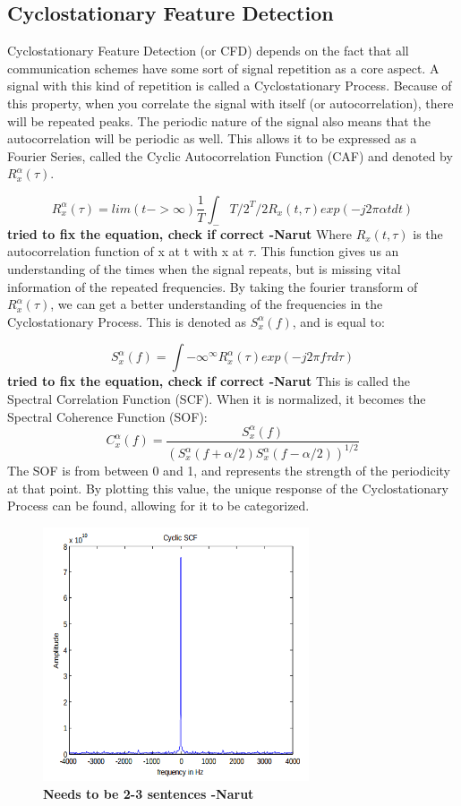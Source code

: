 \subsection{Cyclostationary Feature Detection} \label{Cyclostationary Feature Detection}
Cyclostationary Feature Detection (or CFD) depends on the fact that all communication schemes have some sort of signal repetition as a core aspect. A signal with this kind of repetition is called a Cyclostationary Process\cite{cyclostat_journal}. Because of this property, when you correlate the signal with itself (or autocorrelation), there will be repeated peaks. The periodic nature of the signal also means that the autocorrelation will be periodic as well. This allows it to be expressed as a Fourier Series, called the Cyclic Autocorrelation Function (CAF) and denoted by $R_x^\alpha(\tau)$\cite{cyclostat_text}.\par 
\[R_x^\alpha(\tau)=lim(t->\infty) \frac{1}{T} \int_-T/2^T/2 R_x(t,\tau)exp(-j2\pi\alpha t dt)\] \textbf{tried to fix the equation, check if correct -Narut}
Where $R_x(t,\tau)$ is the autocorrelation function of x at t with x at $\tau$. This function gives us an understanding of the times when the signal repeats, but is missing vital information of the repeated frequencies. By taking the fourier transform of $R_x^\alpha(\tau)$, we can get a better understanding of the frequencies in the Cyclostationary Process. This is denoted as $S_x^\alpha(f)$, and is equal to\cite{cyclostat_text}:  \par
\[ S_x^\alpha(f)=\int{-\infty}^{\infty} R_x^\alpha(\tau)exp(-j2\pi f\tau d\tau) \] \textbf{tried to fix the equation, check if correct -Narut}
This is called the Spectral Correlation Function (SCF). When it is normalized, it becomes the Spectral Coherence Function (SOF)\cite{cyclostat_text}:
\[C_x^\alpha(f) = \frac{ S_x^\alpha(f)}{ (S_x^\alpha(f+\alpha/2) S_x^\alpha(f-\alpha/2))^{1/2}} \]
The SOF is from between 0 and 1, and represents the strength of the periodicity at that point. By plotting this value, the unique response of the Cyclostationary Process can be found, allowing for it to be categorized.\par
\begin{figure}[ht]
\centering
\includegraphics[width=0.70\textwidth]{img/cyclic_scf.png}
\caption{\textbf{Needs to be 2-3 sentences -Narut}}
\label{fig:cyclic_scf}
\end{figure}
